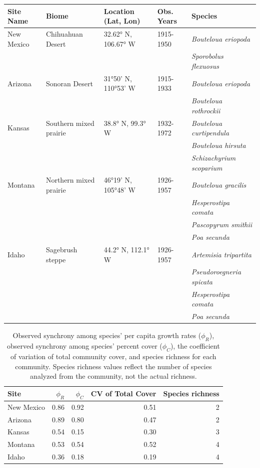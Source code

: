 \documentclass[12pt,]{article}
\begin{document}
\begin{longtable}[c]{@{}lllll@{}}
\toprule
Site Name & Biome & Location (Lat, Lon) & Obs. Years &
Species\tabularnewline
\midrule
\endhead
New Mexico & Chihuahuan Desert & 32.62° N, 106.67° W & 1915-1950 &
\emph{Bouteloua eriopoda}\tabularnewline
& & & & \emph{Sporobolus flexuosus}\tabularnewline
Arizona & Sonoran Desert & 31°50' N, 110°53' W & 1915-1933 &
\emph{Bouteloua eriopoda}\tabularnewline
& & & & \emph{Bouteloua rothrockii}\tabularnewline
Kansas & Southern mixed prairie & 38.8° N, 99.3° W & 1932-1972 &
\emph{Bouteloua curtipendula}\tabularnewline
& & & & \emph{Bouteloua hirsuta}\tabularnewline
& & & & \emph{Schizachyrium scoparium}\tabularnewline
Montana & Northern mixed prairie & 46°19' N, 105°48' W & 1926-1957 &
\emph{Bouteloua gracilis}\tabularnewline
& & & & \emph{Hesperostipa comata}\tabularnewline
& & & & \emph{Pascopyrum smithii}\tabularnewline
& & & & \emph{Poa secunda}\tabularnewline
Idaho & Sagebrush steppe & 44.2° N, 112.1° W & 1926-1957 &
\emph{Artemisia tripartita}\tabularnewline
& & & & \emph{Pseudoroegneria spicata}\tabularnewline
& & & & \emph{Hesperostipa comata}\tabularnewline
& & & & \emph{Poa secunda}\tabularnewline
\bottomrule
\end{longtable}

\normalsize

\pagebreak{}

\begin{table}[ht]
\centering
\caption{Observed synchrony among species' per capita growth rates ($\phi_{R}$), observed synchrony among species' percent cover ($\phi_{C}$), the coefficient of variation of total community cover, and species richness for each community. Species richness values reflect the number of species analyzed from the community, not the actual richness.} 
\begingroup\normalsize
\begin{tabular}{lrrrr}
  \hline
Site & $\phi_{R}$ & $\phi_{C}$ & CV of Total Cover & Species richness \\ 
  \hline
New Mexico & 0.86 & 0.92 & 0.51 &   2 \\ 
  Arizona & 0.89 & 0.80 & 0.47 &   2 \\ 
  Kansas & 0.54 & 0.15 & 0.30 &   3 \\ 
  Montana & 0.53 & 0.54 & 0.52 &   4 \\ 
  Idaho & 0.36 & 0.18 & 0.19 &   4 \\ 
   \hline
\end{tabular}
\endgroup
\end{table}
\end{document}
